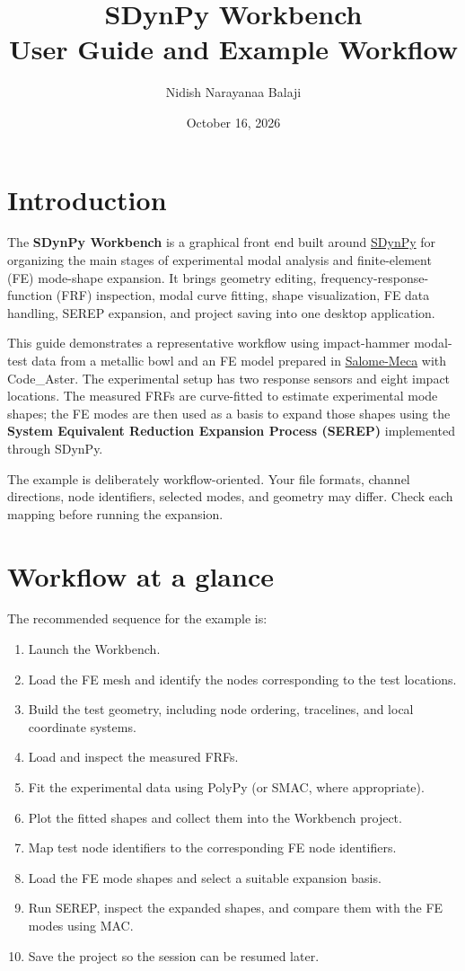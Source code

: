 \documentclass[11pt]{article}
\author{Nidish Narayanaa Balaji}
\date{October 16, 2026}
\title{SDynPy Workbench\\\medskip
\large User Guide and Example Workflow}
\begin{document}
\maketitle
\setcounter{tocdepth}{2}
\tableofcontents

\section*{Introduction}
\label{sec:org96fad66}
The \textbf{SDynPy Workbench} is a graphical front end built around \href{https://sandialabs.github.io/sdynpy/}{SDynPy} for organizing the main stages of experimental modal analysis and finite-element (FE) mode-shape expansion. It brings geometry editing, frequency-response-function (FRF) inspection, modal curve fitting, shape visualization, FE data handling, SEREP expansion, and project saving into one desktop application.

This guide demonstrates a representative workflow using impact-hammer modal-test data from a metallic bowl and an FE model prepared in \href{https://open-simulation-center.org/fr/downloads/code\_aster/SALOME\_MECA}{Salome-Meca} with Code\_Aster. The experimental setup has two response sensors and eight impact locations. The measured FRFs are curve-fitted to estimate experimental mode shapes; the FE modes are then used as a basis to expand those shapes using the \textbf{System Equivalent Reduction Expansion Process (SEREP)} implemented through SDynPy.

The example is deliberately workflow-oriented. Your file formats, channel directions, node identifiers, selected modes, and geometry may differ. Check each mapping before running the expansion.
\section{Workflow at a glance}
\label{sec:orgf6af0c7}

The recommended sequence for the example is:

\begin{enumerate}
\item Launch the Workbench.
\item Load the FE mesh and identify the nodes corresponding to the test locations.
\item Build the test geometry, including node ordering, tracelines, and local coordinate systems.
\item Load and inspect the measured FRFs.
\item Fit the experimental data using PolyPy (or SMAC, where appropriate).
\item Plot the fitted shapes and collect them into the Workbench project.
\item Map test node identifiers to the corresponding FE node identifiers.
\item Load the FE mode shapes and select a suitable expansion basis.
\item Run SEREP, inspect the expanded shapes, and compare them with the FE modes using MAC.
\item Save the project so the session can be resumed later.
\end{enumerate}
\end{document}
